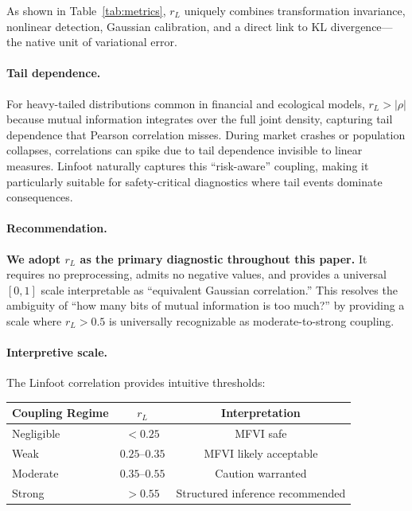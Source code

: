 \documentclass[10pt]{article} %
\theoremstyle{plain}
\theoremstyle{definition}
\begin{document}
\noindent As shown in Table~\ref{tab:metrics}, $r_L$ uniquely combines transformation invariance, nonlinear detection, Gaussian calibration, and a direct link to KL divergence---the native unit of variational error.

\paragraph{Tail dependence.} For heavy-tailed distributions common in financial and ecological models, $r_L > |\rho|$ because mutual information integrates over the full joint density, capturing tail dependence that Pearson correlation misses. During market crashes or population collapses, correlations can spike due to tail dependence invisible to linear measures. Linfoot naturally captures this ``risk-aware'' coupling, making it particularly suitable for safety-critical diagnostics where tail events dominate consequences.

\paragraph{Recommendation.} \textbf{We adopt $r_L$ as the primary diagnostic throughout this paper.} It requires no preprocessing, admits no negative values, and provides a universal $[0,1]$ scale interpretable as ``equivalent Gaussian correlation.'' This resolves the ambiguity of ``how many bits of mutual information is too much?'' by providing a scale where $r_L > 0.5$ is universally recognizable as moderate-to-strong coupling.

\paragraph{Interpretive scale.} The Linfoot correlation provides intuitive thresholds:

\begin{table}[!htbp]
\centering
\begin{tabular}{lcc}
\toprule
Coupling Regime & $r_L$ & Interpretation \\
\midrule
Negligible & $< 0.25$ & MFVI safe \\
Weak & $0.25$--$0.35$ & MFVI likely acceptable \\
Moderate & $0.35$--$0.55$ & Caution warranted \\
Strong & $> 0.55$ & Structured inference recommended \\
\bottomrule
\end{tabular}
\end{table}
\end{document}
